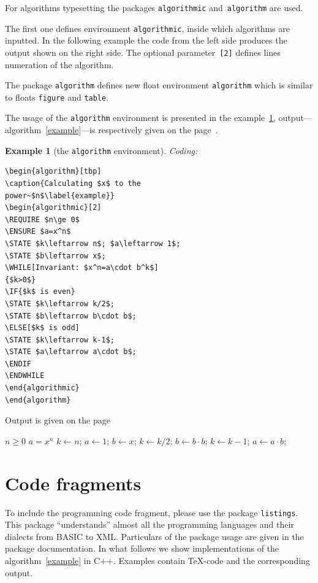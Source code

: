 \documentclass[conference]{IEEEtran}
\newtheorem{example}[remark]{Example}
\begin{document}
For algorithms typesetting the packages \verb|algorithmic| and~\verb|algorithm| are used. 

The first one defines environment \verb|algorithmic|, inside which algorithms are inputted. In the following example the code from the left side produces the output shown on the right side. The optional parameter~\verb|[2]| defines lines numeration of the algorithm.

The  package \verb|algorithm| defines new float environment \verb|algorithm| which is  similar to floats \verb|figure| and \verb|table|. 

The usage of the \verb|algorithm| environment is presented in the example~\ref{algorytm}, output---algorithm~\ref{example}---is respectively given on the page~\pageref{example}.


\begin{example}[the \texttt{algorithm} environment]\label{algorytm}
Coding:\begin{verbatim}\begin{algorithm}[tbp]
\caption{Calculating $x$ to the 
power~$n$\label{example}}
\begin{algorithmic}[2]
\REQUIRE $n\ge 0$
\ENSURE $a=x^n$
\STATE $k\leftarrow n$; $a\leftarrow 1$; 
\STATE $b\leftarrow x$;
\WHILE[Invariant: $x^n=a\cdot b^k$]
{$k>0$}
\IF{$k$ is even}
\STATE $k\leftarrow k/2$;
\STATE $b\leftarrow b\cdot b$;
\ELSE[$k$ is odd]
\STATE $k\leftarrow k-1$;
\STATE $a\leftarrow a\cdot b$;
\ENDIF
\ENDWHILE
\end{algorithmic}
\end{algorithm}
\end{verbatim}
\end{example}

Output is given on the page~\pageref{example}
\begin{algorithm}[tbp]
\caption{Calculating $x$ to the 
power~$n$\label{example}}
\begin{algorithmic}[2]
\REQUIRE $n\ge 0$
\ENSURE $a=x^n$
\STATE $k\leftarrow n$; $a\leftarrow 1$; 
\STATE $b\leftarrow x$;
\STATE $k\leftarrow k/2$;
\STATE $b\leftarrow b\cdot b$;
\ELSE[$k$ is odd]
\STATE $k\leftarrow k-1$;
\STATE $a\leftarrow a\cdot b$;
\ENDIF
\ENDWHILE
\end{algorithmic}
\end{algorithm}


\section{Code fragments}
To include the programming code fragment, please use the package \verb|listings|. This package ``understands'' almost all the programming languages and their dialects from BASIC to XML. Particulars of the package usage are given in the package documentation. In what follows we show implementations of the algorithm~\ref{example} in C++. Examples contain \TeX-code and the corresponding output.
\end{document}
